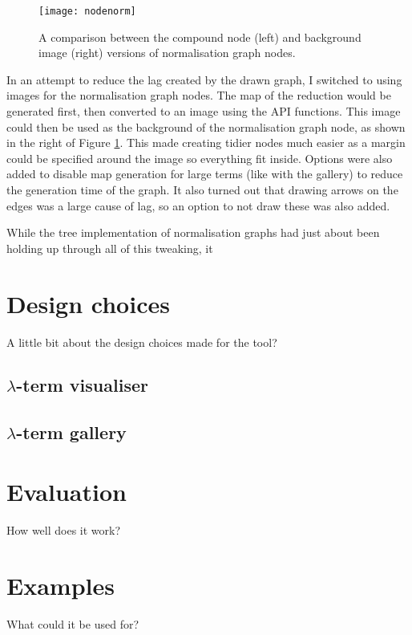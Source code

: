 \documentclass[11pt]{article}
\begin{document}
\begin{figure}
    \centering
    \texttt{[image: nodenorm]}
    \caption{A comparison between the compound node (left) and background image (right) versions of normalisation graph nodes.}
    \label{fig:normnodes}
\end{figure}

In an attempt to reduce the lag created by the drawn graph, I switched to using images for the normalisation graph nodes. The map of the reduction would be generated first, then converted to an image using the API functions. This image could then be used as the background of the normalisation graph node, as shown in the right of Figure \ref{fig:normnodes}. This made creating tidier nodes much easier as a margin could be specified around the image so everything fit inside. Options were also added to disable map generation for large terms (like with the gallery) to reduce the generation time of the graph. It also turned out that drawing arrows on the edges was a large cause of lag, so an option to not draw these was also added. 

While the tree implementation of normalisation graphs had just about been holding up through all of this tweaking, it 

\newpage

\section{Design choices}
\label{sec:design}
A little bit about the design choices made for the tool?

\subsection{\texorpdfstring{$\lambda$}{Lambda}-term visualiser}


\subsection{\texorpdfstring{$\lambda$}{Lambda}-term gallery}


\newpage
\section{Evaluation}
\label{sec:evaluation}
How well does it work?

\newpage
\section{Examples}
What could it be used for?
\end{document}

